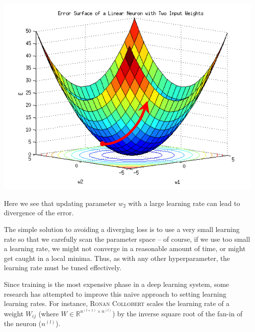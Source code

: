 \documentclass{tufte-handout}
\begin{document}
\begin{marginfigure}%
  \includegraphics[width=\linewidth]{Error_Surf}
  \caption{Here we see that updating parameter $w_2$ with a large learning rate can lead to divergence of the error.}
  \label{fig:ErrorSurf}
\end{marginfigure}

The simple solution to avoiding a diverging loss is to use a very small learning rate so that we carefully scan the parameter space -- of course, if we use too small a learning rate, we might not converge in a reasonable amount of time, or might get caught in a local minima.  Thus, as with any other hyperparameter, the learning rate must be tuned effectively.


Since training is the most expensive phase in a deep learning system, some research has attempted to improve this naive approach to setting learning learning rates. For instance, \textsc{Ronan Collobert} scales the learning rate of a weight $W_{ij}$  (where $W \in \mathbb{R}^{n^{(l+1)}\times n^{(l)}}$) by the inverse square root of the fan-in of the neuron ($n^{(l)}$). 
\end{document}
